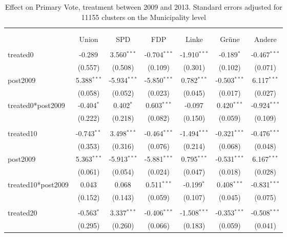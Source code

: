 \documentclass[12pt]{article}
\begin{document}
 
\begin{table}[!htbp] \centering
  \caption{Effect on Primary Vote, treatment between 2009 and 2013. Standard errors adjusted for 11155 clusters on the Municipality level}
\begin{tabular}{@{\extracolsep{5pt}}lcccccc}
\\[-1.8ex]\hline
\hline \\[-1.8ex]
\\[-1.8ex] & \multicolumn{1}{c}{Union} & \multicolumn{1}{c}{SPD} & \multicolumn{1}{c}{FDP} & \multicolumn{1}{c}{Linke} & \multicolumn{1}{c}{Grüne} & \multicolumn{1}{c}{Andere}  \\
\hline \\[-1.8ex]
 treated0 & -0.289$^{}$ & 3.560$^{***}$ & -0.704$^{***}$ & -1.910$^{***}$ & -0.189$^{*}$ & -0.467$^{***}$ \\
  & (0.557) & (0.508) & (0.109) & (0.301) & (0.102) & (0.071) \\
 post2009 & 5.388$^{***}$ & -5.934$^{***}$ & -5.850$^{***}$ & 0.782$^{***}$ & -0.503$^{***}$ & 6.117$^{***}$ \\
  & (0.058) & (0.052) & (0.023) & (0.045) & (0.017) & (0.027) \\
 treated0*post2009 & -0.404$^{*}$ & 0.402$^{*}$ & 0.603$^{***}$ & -0.097$^{}$ & 0.420$^{***}$ & -0.924$^{***}$ \\
  & (0.222) & (0.218) & (0.082) & (0.150) & (0.059) & (0.109) \\
\hline \\[-1.8ex]
 treated10 & -0.743$^{**}$ & 3.498$^{***}$ & -0.464$^{***}$ & -1.494$^{***}$ & -0.321$^{***}$ & -0.476$^{***}$ \\
  & (0.353) & (0.316) & (0.076) & (0.214) & (0.068) & (0.048) \\
 post2009 & 5.363$^{***}$ & -5.913$^{***}$ & -5.881$^{***}$ & 0.795$^{***}$ & -0.531$^{***}$ & 6.167$^{***}$ \\
  & (0.061) & (0.054) & (0.024) & (0.047) & (0.018) & (0.028) \\
 treated10*post2009 & 0.043$^{}$ & 0.068$^{}$ & 0.511$^{***}$ & -0.199$^{*}$ & 0.408$^{***}$ & -0.831$^{***}$ \\
  & (0.152) & (0.143) & (0.059) & (0.107) & (0.045) & (0.075) \\
\hline \\[-1.8ex]
 treated20 & -0.563$^{*}$ & 3.337$^{***}$ & -0.406$^{***}$ & -1.508$^{***}$ & -0.353$^{***}$ & -0.508$^{***}$ \\
  & (0.295) & (0.260) & (0.066) & (0.183) & (0.059) & (0.041) \\

\end{tabular}
\end{table}
\end{document}

